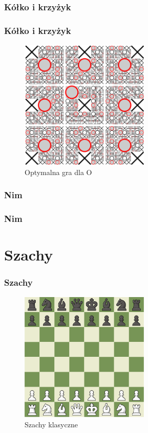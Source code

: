\documentclass[polish,envcountsect,10pt]{beamer}
\begin{document}
        \subsubsection{Kółko i krzyżyk}
            \begin{frame}
                \frametitle{Kółko i krzyżyk}
                \begin{figure}[H]
                    \centering
                    \includegraphics[width=0.55\textwidth,natwidth=480,natheight=480]{images/480px-Tictactoe-O.svg.png}
                    \caption{Optymalna gra dla O}
                \end{figure}
            \end{frame}
        \subsubsection{Nim}
            \begin{frame}
                \frametitle{Nim}                
            \end{frame}
    \section{Szachy}
        \begin{frame}
            \frametitle{Szachy}
            \begin{figure}[]
                \centering
                \includegraphics[width=0.55\textwidth]{images/chess.png}
                \caption{Szachy klasyczne}
            \end{figure}
        \end{frame}
\end{document}
